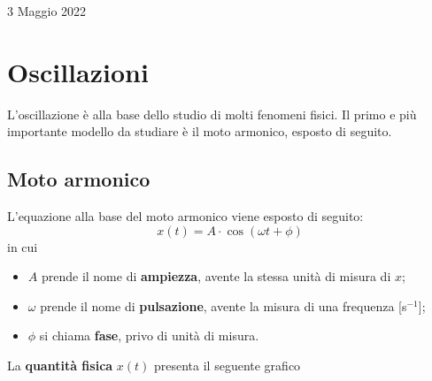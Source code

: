 \documentclass[a4paper]{extarticle}
\begin{document}
\newpage
\noindent
\begin{center}
  3 Maggio 2022
\end{center}
\section{Oscillazioni}
L'oscillazione è alla base dello studio di molti fenomeni fisici. Il primo e più importante modello da studiare è il moto armonico, esposto di seguito.

\vspace{1em}
\subsection{Moto armonico}
L'equazione alla base del moto armonico viene esposto di seguito:
\[\boxed{x(t) = A \cdot \cos(\omega t + \phi)}\]
in cui
\begin{itemize}
  \item $A$ prende il nome di \textbf{ampiezza}, avente la stessa unità di misura di $x$;
  \item $\omega$ prende il nome di \textbf{pulsazione}, avente la misura di una frequenza [s$^{-1}$];
  \item $\phi$ si chiama \textbf{fase}, privo di unità di misura.
\end{itemize}
La \textbf{quantità fisica} $x(t)$ presenta il seguente grafico
\end{document}
